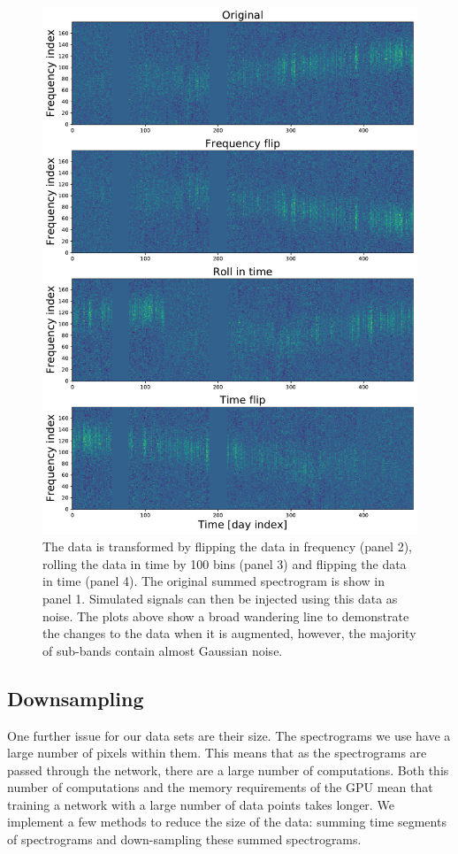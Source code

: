 \begin{figure}
	\centering
	\includegraphics[width=0.7\columnwidth]{C4_cnn/augmentation.pdf}
	\caption{The data is transformed by flipping the data in frequency (panel 2), rolling the data in time by 100 bins (panel 3) and flipping the data in time (panel 4). The original summed spectrogram is show in panel 1. Simulated signals can then be injected using this data as noise. The plots above show a broad wandering line to demonstrate the changes to the data when it is augmented, however, the majority of sub-bands contain almost Gaussian noise. }
	\label{data:augmentation:examples}
\end{figure}

\subsection{\label{data:downsample} Downsampling}

%
One further issue for our data sets are their size. The spectrograms we use have a large number of pixels within them.
This means that as the spectrograms are passed through the network, there are a large number of computations.
Both this number of computations and the memory requirements of the GPU mean that training a network with a large number of data points takes longer.
We implement a few methods to reduce the size of the data: summing time segments of
spectrograms and down-sampling these summed spectrograms.  


